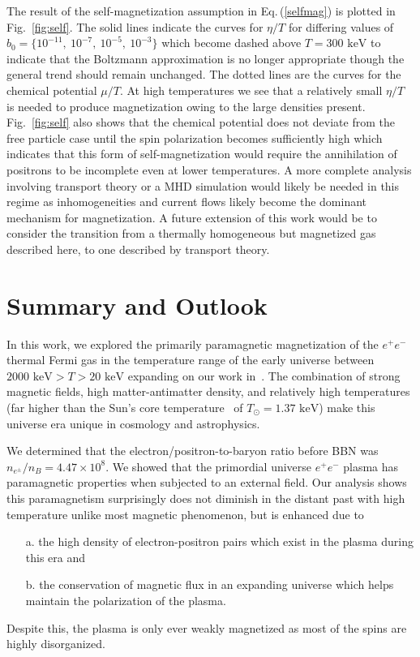 \documentclass[reprint]{revtex4-2}
\newcommand*{\keV}{\text{ keV}}
\newcommand{\req}[1]{Eq.\,(\ref{#1})}
\newcommand{\rf}[1]{Fig.~{\ref{#1}}}
\begin{document}
The result of the self-magnetization assumption in \req{selfmag} is plotted in \rf{fig:self}. The solid lines indicate the curves for $\eta/T$ for differing values of $b_{0}=\{10^{-11},\ 10^{-7},\ 10^{-5},\ 10^{-3}\}$ which become dashed above $T=300\keV$ to indicate that the Boltzmann approximation is no longer appropriate though the general trend should remain unchanged. The dotted lines are the curves for the chemical potential $\mu/T$. At high temperatures we see that a relatively small $\eta/T$ is needed to produce magnetization owing to the large densities present. \rf{fig:self} also shows that the chemical potential does not deviate from the free particle case until the spin polarization becomes sufficiently high which indicates that this form of self-magnetization would require the annihilation of positrons to be incomplete even at lower temperatures. A more complete analysis involving transport theory or a MHD simulation would likely be needed in this regime as inhomogeneities and current flows likely become the dominant mechanism for magnetization. A future extension of this work would be to consider the transition from a thermally homogeneous but magnetized gas described here, to one described by transport theory.

\section{Summary and Outlook}
\label{sec:conclusions}
\noindent In this work, we explored the primarily paramagnetic magnetization of the $e^{+}e^{-}$ thermal Fermi gas in the temperature range of the early universe between $2000\keV>T>20\keV$ expanding on our work in~\cite{rafelski2023short}. The combination of strong magnetic fields, high matter-antimatter density, and relatively high temperatures (far higher than the Sun's core temperature~\cite{bahcall2001solar} of $T_{\odot}=1.37\keV$) make this universe era unique in cosmology and astrophysics.

We determined that the electron/positron-to-baryon ratio before BBN was $n_{e^{\pm}}/n_{B}=4.47\times10^{8}$. We showed that the primordial universe $e^{+}e^{-}$ plasma has paramagnetic properties when subjected to an external field. Our analysis shows this paramagnetism surprisingly does not diminish in the distant past with high temperature unlike most magnetic phenomenon, but is enhanced due to
\begin{itemize}
    \item[a.] the high density of electron-positron pairs which exist in the plasma during this era and
    \item[b.] the conservation of magnetic flux in an expanding universe which helps maintain the polarization of the plasma.
\end{itemize}
Despite this, the plasma is only ever weakly magnetized as most of the spins are highly disorganized.
\end{document}
